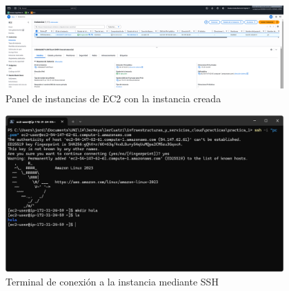 \documentclass{article}
\begin{document}
	\begin{figure}[H]
	\centering
	\includegraphics[width=0.95\textwidth]{tarea_final_1.png}
	\caption{Panel de instancias de EC2 con la instancia creada}
	\end{figure}

	\begin{figure}[H]
	\centering
	\includegraphics[width=0.95\textwidth]{tarea_final_2.png}
	\caption{Terminal de conexión a la instancia mediante SSH}
	\end{figure}
\end{document}
